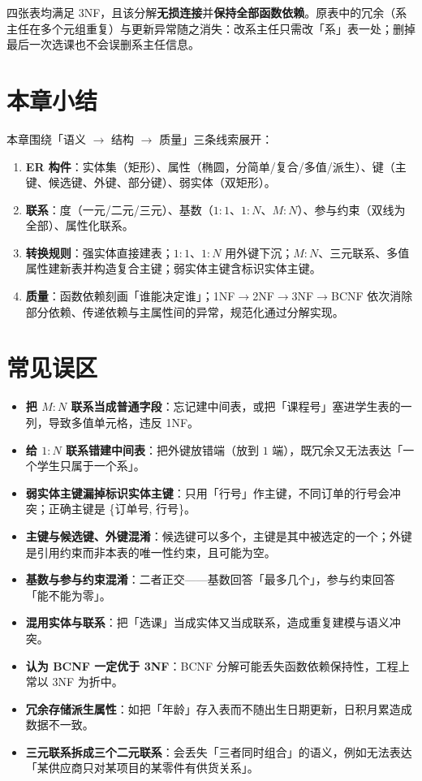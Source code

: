 四张表均满足 3NF，且该分解\textbf{无损连接}并\textbf{保持全部函数依赖}。原表中的冗余（系主任在多个元组重复）与更新异常随之消失：改系主任只需改「系」表一处；删掉最后一次选课也不会误删系主任信息。

\section{本章小结}

本章围绕「语义 $\to$ 结构 $\to$ 质量」三条线索展开：

\begin{enumerate}
    \item \textbf{ER 构件}：实体集（矩形）、属性（椭圆，分简单/复合/多值/派生）、键（主键、候选键、外键、部分键）、弱实体（双矩形）。
    \item \textbf{联系}：度（一元/二元/三元）、基数（$1{:}1$、$1{:}N$、$M{:}N$）、参与约束（双线为全部）、属性化联系。
    \item \textbf{转换规则}：强实体直接建表；$1{:}1$、$1{:}N$ 用外键下沉；$M{:}N$、三元联系、多值属性建新表并构造复合主键；弱实体主键含标识实体主键。
    \item \textbf{质量}：函数依赖刻画「谁能决定谁」；1NF$\to$2NF$\to$3NF$\to$BCNF 依次消除部分依赖、传递依赖与主属性间的异常，规范化通过分解实现。
\end{enumerate}

\section{常见误区}

\begin{itemize}
    \item \textbf{把 $M{:}N$ 联系当成普通字段}：忘记建中间表，或把「课程号」塞进学生表的一列，导致多值单元格，违反 1NF。
    \item \textbf{给 $1{:}N$ 联系错建中间表}：把外键放错端（放到 $1$ 端），既冗余又无法表达「一个学生只属于一个系」。
    \item \textbf{弱实体主键漏掉标识实体主键}：只用「行号」作主键，不同订单的行号会冲突；正确主键是 \{订单号, 行号\}。
    \item \textbf{主键与候选键、外键混淆}：候选键可以多个，主键是其中被选定的一个；外键是引用约束而非本表的唯一性约束，且可能为空。
    \item \textbf{基数与参与约束混淆}：二者正交——基数回答「最多几个」，参与约束回答「能不能为零」。
    \item \textbf{混用实体与联系}：把「选课」当成实体又当成联系，造成重复建模与语义冲突。
    \item \textbf{认为 BCNF 一定优于 3NF}：BCNF 分解可能丢失函数依赖保持性，工程上常以 3NF 为折中。
    \item \textbf{冗余存储派生属性}：如把「年龄」存入表而不随出生日期更新，日积月累造成数据不一致。
    \item \textbf{三元联系拆成三个二元联系}：会丢失「三者同时组合」的语义，例如无法表达「某供应商只对某项目的某零件有供货关系」。
\end{itemize}
